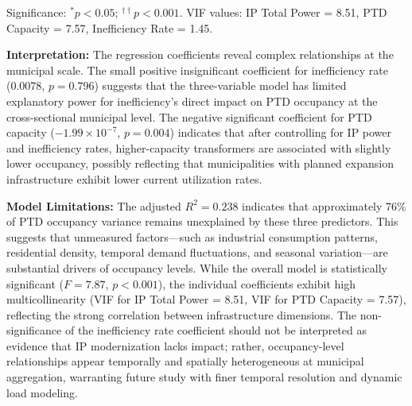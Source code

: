 \documentclass[conference]{IEEEtran}
\begin{document}
\begin{table}[htbp]
\centering
\caption{Multiple Linear Regression Model Results (n=67 municipalities)}
\small
{}
\vspace{1mm}
\footnotesize{Significance: $^{*}p < 0.05$; $^{\dagger\dagger}p < 0.001$. VIF values: IP Total Power = 8.51, PTD Capacity = 7.57, Inefficiency Rate = 1.45.}
\label{tab:regression_model}
\end{table}

\textbf{Interpretation:} The regression coefficients reveal complex relationships at the municipal scale. The small positive insignificant coefficient for inefficiency rate (0.0078, $p = 0.796$) suggests that the three-variable model has limited explanatory power for inefficiency's direct impact on PTD occupancy at the cross-sectional municipal level. The negative significant coefficient for PTD capacity ($-1.99 \times 10^{-7}$, $p = 0.004$) indicates that after controlling for IP power and inefficiency rates, higher-capacity transformers are associated with slightly lower occupancy, possibly reflecting that municipalities with planned expansion infrastructure exhibit lower current utilization rates.

\textbf{Model Limitations:} The adjusted $R^2 = 0.238$ indicates that approximately 76\% of PTD occupancy variance remains unexplained by these three predictors. This suggests that unmeasured factors---such as industrial consumption patterns, residential density, temporal demand fluctuations, and seasonal variation---are substantial drivers of occupancy levels. While the overall model is statistically significant ($F = 7.87$, $p < 0.001$), the individual coefficients exhibit high multicollinearity (VIF for IP Total Power = 8.51, VIF for PTD Capacity = 7.57), reflecting the strong correlation between infrastructure dimensions. The non-significance of the inefficiency rate coefficient should not be interpreted as evidence that IP modernization lacks impact; rather, occupancy-level relationships appear temporally and spatially heterogeneous at municipal aggregation, warranting future study with finer temporal resolution and dynamic load modeling.
\end{document}
